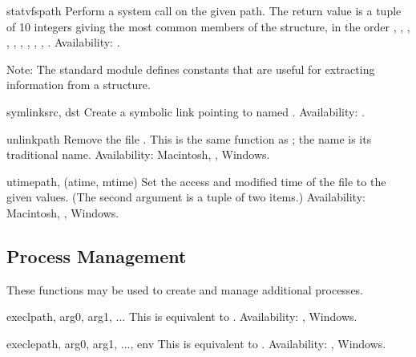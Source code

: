 \begin{funcdesc}{statvfs}{path}
Perform a  system call on the given path.  The
return value is a tuple of 10 integers giving the most common
members of the  structure, in the order
,
,
,
,
,
,
,
,
,
.
Availability: \UNIX{}.

Note: The standard module 
defines constants that are useful for extracting information
from a  structure.
\end{funcdesc}

\begin{funcdesc}{symlink}{src, dst}
Create a symbolic link pointing to  named .
Availability: \UNIX{}.
\end{funcdesc}

\begin{funcdesc}{unlink}{path}
Remove the file .  This is the same function as
; the  name is its traditional
\UNIX{} name.
Availability: Macintosh, \UNIX{}, Windows.
\end{funcdesc}

\begin{funcdesc}{utime}{path, (atime, mtime)}
Set the access and modified time of the file to the given values.
(The second argument is a tuple of two items.)
Availability: Macintosh, \UNIX{}, Windows.
\end{funcdesc}


\subsection{Process Management \label{os-process}}

These functions may be used to create and manage additional
processes.


\begin{funcdesc}{execl}{path, arg0, arg1, ...}
This is equivalent to
.
Availability: \UNIX{}, Windows.
\end{funcdesc}

\begin{funcdesc}{execle}{path, arg0, arg1, ..., env}
This is equivalent to
.
Availability: \UNIX{}, Windows.
\end{funcdesc}

